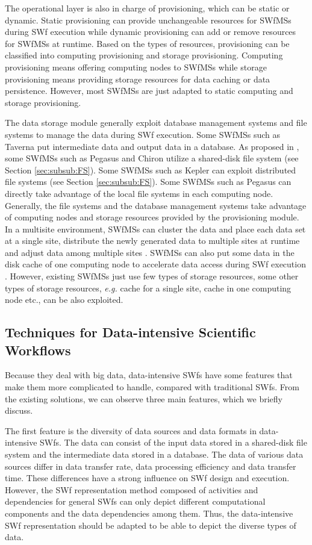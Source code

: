 The operational layer is also in charge of provisioning, which can be static or dynamic. Static provisioning can provide unchangeable resources for SWfMSs during SWf execution while dynamic provisioning can add or remove resources for SWfMSs at runtime. Based on the types of resources, provisioning can be classified into computing provisioning and storage provisioning. Computing
provisioning means offering computing nodes to SWfMSs while storage provisioning means providing storage resources for data caching or data persistence. However, most SWfMSs are just adapted to static computing and storage provisioning.

The data storage module generally exploit database management systems and file systems to manage the data during SWf execution. Some SWfMSs such as Taverna put intermediate data and output data in a database. As proposed in \cite{Zhao2008}, some SWfMSs such as Pegasus and Chiron utilize a shared-disk file system (see Section \ref{sec:subsub:FS}). Some SWfMSs such as Kepler \cite{Wang2009} can exploit distributed file systems (see Section \ref{sec:subsub:FS}). Some SWfMSs such as Pegasus can directly take advantage of the local file systems in each computing node. Generally, the file systems and the database management systems take advantage of computing nodes and storage resources provided by the provisioning module. In a multisite environment, SWfMSs can cluster the data and place each data set at a single site, distribute the newly generated data to multiple sites at runtime and adjust data among multiple sites \cite{Yuan2010}. SWfMSs can also put some data in the disk cache of one computing node to accelerate data access during SWf execution \cite{Shankar2007}. However, existing SWfMSs just use few types of storage resources, some other types of storage resources, \textit{e.g.} cache for a single site, cache in one computing node etc., can be also exploited.


\subsection{Techniques for Data-intensive Scientific Workflows}

Because they deal with big data, data-intensive SWfs have some features that make them more complicated to handle, compared with traditional SWfs. From the existing solutions, we can observe three main features, which we briefly discuss.

The first feature is the diversity of data sources and data formats
in data-intensive SWfs. The data can consist of the
input data stored in a shared-disk file system and the intermediate
data stored in a database. The data of various data sources differ
in data transfer rate, data processing efficiency and data transfer
time. These differences have a strong influence on SWf design
and execution. However, the SWf representation method composed
of activities and dependencies for general SWfs can only depict
different computational components and the data dependencies among
them. Thus, the data-intensive SWf representation should be adapted
to be able to depict the diverse types of data.

